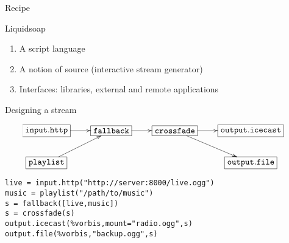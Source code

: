 \documentclass{beamer}
\begin{document}

\begin{frame}{Recipe}

\begin{block}{Liquidsoap}
\begin{enumerate}
\item<3-> A script language
\item A notion of source (interactive stream generator)
\item<2-> Interfaces: libraries, external and remote applications
\end{enumerate}
\end{block}

\end{frame}


\begin{frame}[fragile]{Designing a stream}

\[
\hspace{-0.4cm}\xymatrix{
  *+[F]{\mathtt{input.http}} \ar[r] &
     *+[F]{\mathtt{fallback}}\ar[r] &
     *+[F]{\mathtt{crossfade}} \ar[r]\ar[dr] &
     *+[F]{\mathtt{output.icecast}} \\
  *+[F]{\mathtt{playlist}}\ar[ur] & & &
     *+[F]{\mathtt{output.file}}\\
}
\]

\vfill
\pause

\begin{lstlisting}
live = input.http("http://server:8000/live.ogg")
music = playlist("/path/to/music")
s = fallback([live,music])
s = crossfade(s)
output.icecast(%vorbis,mount="radio.ogg",s)
output.file(%vorbis,"backup.ogg",s)
\end{lstlisting}

\end{frame}

\end{document}

